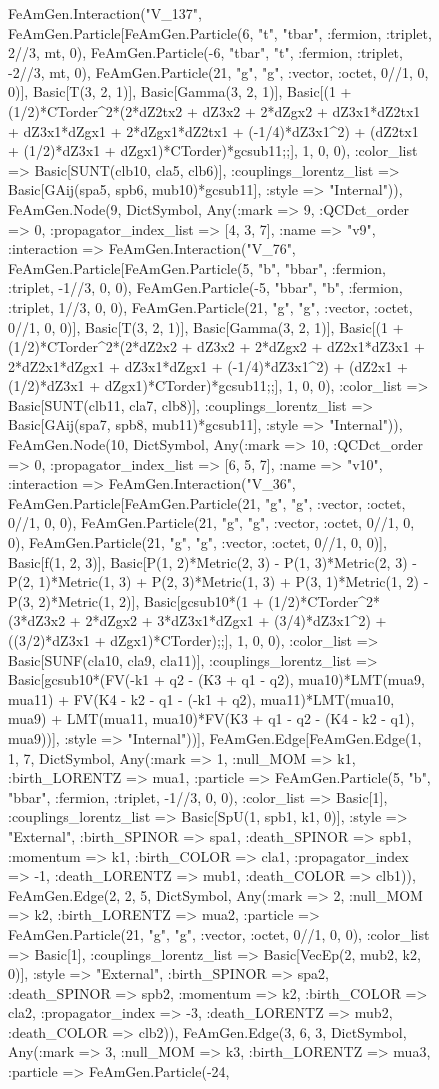\documentclass{revtex4}
\begin{document}
\begin{figure}[!htb]
\begin{center}
{FeAmGen.Interaction("V_137", FeAmGen.Particle[FeAmGen.Particle(6, "t", "tbar", :fermion, :triplet, 2//3, mt, 0), FeAmGen.Particle(-6, "tbar", "t", :fermion, :triplet, -2//3, mt, 0), FeAmGen.Particle(21, "g", "g", :vector, :octet, 0//1, 0, 0)], Basic[T(3, 2, 1)], Basic[Gamma(3, 2, 1)], Basic[(1 + (1/2)*CTorder^2*(2*dZ2tx2 + dZ3x2 + 2*dZgx2 + dZ3x1*dZ2tx1 + dZ3x1*dZgx1 + 2*dZgx1*dZ2tx1 + (-1/4)*dZ3x1^2) + (dZ2tx1 + (1/2)*dZ3x1 + dZgx1)*CTorder)*gcsub11;;], 1, 0, 0), :color_list => Basic[SUNT(clb10, cla5, clb6)], :couplings_lorentz_list => Basic[GAij(spa5, spb6, mub10)*gcsub11], :style => "Internal")), FeAmGen.Node(9, Dict{Symbol, Any}(:mark => 9, :QCDct_order => 0, :propagator_index_list => [4, 3, 7], :name => "v9", :interaction => FeAmGen.Interaction("V_76", FeAmGen.Particle[FeAmGen.Particle(5, "b", "bbar", :fermion, :triplet, -1//3, 0, 0), FeAmGen.Particle(-5, "bbar", "b", :fermion, :triplet, 1//3, 0, 0), FeAmGen.Particle(21, "g", "g", :vector, :octet, 0//1, 0, 0)], Basic[T(3, 2, 1)], Basic[Gamma(3, 2, 1)], Basic[(1 + (1/2)*CTorder^2*(2*dZ2x2 + dZ3x2 + 2*dZgx2 + dZ2x1*dZ3x1 + 2*dZ2x1*dZgx1 + dZ3x1*dZgx1 + (-1/4)*dZ3x1^2) + (dZ2x1 + (1/2)*dZ3x1 + dZgx1)*CTorder)*gcsub11;;], 1, 0, 0), :color_list => Basic[SUNT(clb11, cla7, clb8)], :couplings_lorentz_list => Basic[GAij(spa7, spb8, mub11)*gcsub11], :style => "Internal")), FeAmGen.Node(10, Dict{Symbol, Any}(:mark => 10, :QCDct_order => 0, :propagator_index_list => [6, 5, 7], :name => "v10", :interaction => FeAmGen.Interaction("V_36", FeAmGen.Particle[FeAmGen.Particle(21, "g", "g", :vector, :octet, 0//1, 0, 0), FeAmGen.Particle(21, "g", "g", :vector, :octet, 0//1, 0, 0), FeAmGen.Particle(21, "g", "g", :vector, :octet, 0//1, 0, 0)], Basic[f(1, 2, 3)], Basic[P(1, 2)*Metric(2, 3) - P(1, 3)*Metric(2, 3) - P(2, 1)*Metric(1, 3) + P(2, 3)*Metric(1, 3) + P(3, 1)*Metric(1, 2) - P(3, 2)*Metric(1, 2)], Basic[gcsub10*(1 + (1/2)*CTorder^2*(3*dZ3x2 + 2*dZgx2 + 3*dZ3x1*dZgx1 + (3/4)*dZ3x1^2) + ((3/2)*dZ3x1 + dZgx1)*CTorder);;], 1, 0, 0), :color_list => Basic[SUNF(cla10, cla9, cla11)], :couplings_lorentz_list => Basic[gcsub10*(FV(-k1 + q2 - (K3 + q1 - q2), mua10)*LMT(mua9, mua11) + FV(K4 - k2 - q1 - (-k1 + q2), mua11)*LMT(mua10, mua9) + LMT(mua11, mua10)*FV(K3 + q1 - q2 - (K4 - k2 - q1), mua9))], :style => "Internal"))], FeAmGen.Edge[FeAmGen.Edge(1, 1, 7, Dict{Symbol, Any}(:mark => 1, :null_MOM => k1, :birth_LORENTZ => mua1, :particle => FeAmGen.Particle(5, "b", "bbar", :fermion, :triplet, -1//3, 0, 0), :color_list => Basic[1], :couplings_lorentz_list => Basic[SpU(1, spb1, k1, 0)], :style => "External", :birth_SPINOR => spa1, :death_SPINOR => spb1, :momentum => k1, :birth_COLOR => cla1, :propagator_index => -1, :death_LORENTZ => mub1, :death_COLOR => clb1)), FeAmGen.Edge(2, 2, 5, Dict{Symbol, Any}(:mark => 2, :null_MOM => k2, :birth_LORENTZ => mua2, :particle => FeAmGen.Particle(21, "g", "g", :vector, :octet, 0//1, 0, 0), :color_list => Basic[1], :couplings_lorentz_list => Basic[VecEp(2, mub2, k2, 0)], :style => "External", :birth_SPINOR => spa2, :death_SPINOR => spb2, :momentum => k2, :birth_COLOR => cla2, :propagator_index => -3, :death_LORENTZ => mub2, :death_COLOR => clb2)), FeAmGen.Edge(3, 6, 3, Dict{Symbol, Any}(:mark => 3, :null_MOM => k3, :birth_LORENTZ => mua3, :particle => FeAmGen.Particle(-24, }
\end{center}
\end{figure}
\end{document}
